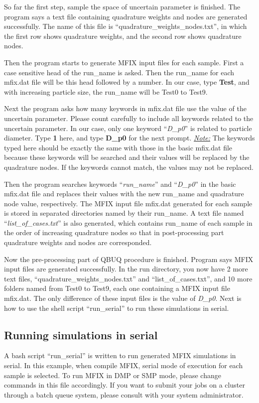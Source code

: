 \documentclass[a4paper,12pt,titlepage]{article}
\begin{document}
So far the first step, sample the space of uncertain parameter is finished. The
program says a text file containing quadrature weights and nodes are generated 
successfully. The name of this file is ``quadrature\_weights\_nodes.txt'', in 
which the first row shows quadrature weights, and the second row shows 
quadrature nodes.

Then the program starts to generate MFIX input files for each sample. First a 
case sensitive head of the run\_name is asked. Then the run\_name for each 
mfix.dat file will be this head followed by a number. In our case, type 
\textbf{Test}, and with increasing particle size, the run\_name will be Test0 to 
Test9.

Next the program asks how many keywords in mfix.dat file use the value of the 
uncertain parameter. Please count carefully to include all keywords related to
the uncertain parameter. In our case, only one keyword ``\emph{D\_p0}'' is 
related to particle diameter. Type \textbf{1} here, and type \textbf{D\_p0} for 
the next prompt. \emph{\underline{Note:}} The keywords typed here should be 
exactly the same with those in the basic mfix.dat file because these keywords 
will be searched and their values will be replaced by the quadrature nodes. If 
the keywords cannot match, the values may not be replaced.

Then the program searches keywords ``\emph{run\_name}'' and  ``\emph{D\_p0}'' in 
the basic mfix.dat file and replaces their values with the new run\_name and 
quadrature node value, respectively. The MFIX input file mfix.dat generated for 
each sample is stored in separated directories named by their run\_name. A text
file named ``\emph{list\_of\_cases.txt}'' is also generated, which contains 
run\_name of each sample in the order of increasing quadrature nodes so that in
post-processing part quadrature weights and nodes are corresponded. 

Now the pre-processing part of QBUQ procedure is finished. Program says MFIX 
input files are generated successfully. In the run directory, you now have 2 
more text files, ``quadrature\_weights\_nodes.txt'' and ``list\_of\_cases.txt'', 
and 10 more folders named from Test0 to Test9, each one containing a MFIX input 
file mfix.dat. The only difference of these input files is the value of 
\emph{D\_p0}. Next is how to use the shell script ``run\_serial'' to run these 
simulations in serial.

\subsection{Running simulations in serial}
\label{sec:RunSerial}
A bash script ``run\_serial'' is written to run generated MFIX simulations in 
serial. In this example, when compile MFIX, serial mode of execution for each 
sample is selected. To run MFIX in DMP or SMP mode, please change commands
in this file accordingly. If you want to submit your jobs on a cluster through
a batch queue system, please consult with your system administrator.
\end{document}
